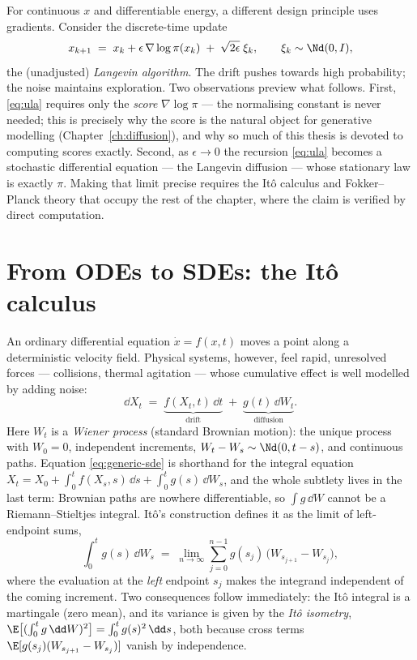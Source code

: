 For continuous $x$ and differentiable energy, a different design principle
uses gradients. Consider the discrete-time update
\begin{equation}
  x_{k+1} \;=\; x_k + \epsilon\, \nabla \log \pi(x_k)
  \;+\; \sqrt{2\epsilon}\; \xi_k ,
  \qquad \xi_k \sim \Nd(0, I),
  \label{eq:ula}
\end{equation}
the (unadjusted) \emph{Langevin algorithm}. The drift pushes towards high
probability; the noise maintains exploration. Two observations preview what
follows. First, \eqref{eq:ula} requires only the \emph{score}
$\nabla \log \pi$ --- the normalising constant is never needed; this is
precisely why the score is the natural object for generative modelling
(Chapter~\ref{ch:diffusion}), and why so much of this thesis is devoted to
computing scores exactly. Second, as $\epsilon \to 0$ the recursion
\eqref{eq:ula} becomes a stochastic differential equation --- the Langevin
diffusion --- whose stationary law is exactly $\pi$. Making that limit
precise requires the It\^o calculus and Fokker--Planck theory that occupy
the rest of the chapter, where the claim is verified by direct computation.

\section{From ODEs to SDEs: the It\^o calculus}\label{sec:ode-to-sde}

An ordinary differential equation $\dot x = f(x, t)$ moves a point along a
deterministic velocity field. Physical systems, however, feel rapid,
unresolved forces --- collisions, thermal agitation --- whose cumulative
effect is well modelled by adding noise:
\begin{equation}
  \dd X_t \;=\; \underbrace{f(X_t, t)\,\dd t}_{\text{drift}}
  \;+\; \underbrace{g(t)\,\dd W_t}_{\text{diffusion}} .
  \label{eq:generic-sde}
\end{equation}
Here $W_t$ is a \emph{Wiener process} (standard Brownian motion): the unique
process with $W_0 = 0$, independent increments,
$W_t - W_s \sim \Nd(0, t-s)$, and continuous paths. Equation
\eqref{eq:generic-sde} is shorthand for the integral equation
$X_t = X_0 + \int_0^t f(X_s, s)\,\dd s + \int_0^t g(s)\,\dd W_s$, and the
whole subtlety lives in the last term: Brownian paths are nowhere
differentiable, so $\int g\,\dd W$ cannot be a Riemann--Stieltjes integral.
It\^o's construction \citep{ito1944stochastic} defines it as the limit of
left-endpoint sums,
\begin{equation}
  \int_0^t g(s)\, \dd W_s
  \;=\; \lim_{n \to \infty} \sum_{j=0}^{n-1}
        g(s_j)\,\big( W_{s_{j+1}} - W_{s_j} \big),
  \label{eq:ito-integral}
\end{equation}
where the evaluation at the \emph{left} endpoint $s_j$ makes the integrand
independent of the coming increment. Two consequences follow immediately:
the It\^o integral is a martingale (zero mean), and its variance is given by
the \emph{It\^o isometry},
$\E\big[ (\int_0^t g\,\dd W)^2 \big] = \int_0^t g(s)^2\,\dd s$, both because
cross terms $\E[g(s_j)(W_{s_{j+1}}-W_{s_j})] $ vanish by independence.

